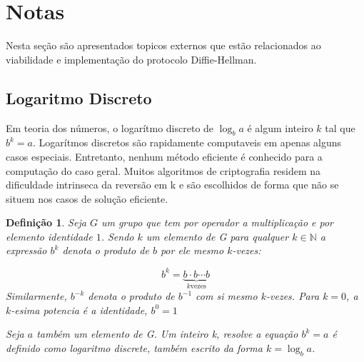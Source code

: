 \documentclass{article}
\newtheorem*{definition}{Definição}
\begin{document}
\section{Notas}%
\label{sec:notas}
Nesta seção são apresentados topicos externos que estão relacionados ao
viabilidade e implementação do protocolo Diffie-Hellman.

\subsection{Logaritmo Discreto}%
\label{sub:logaritmo_discreto}
Em teoria dos números, o logarítmo discreto de $\log_{b}{a}$ é algum inteiro
$k$ tal que $b^k=a$. Logarítmos discretos são rapidamente computaveis em apenas
alguns casos especiais. Entretanto, nenhum método eficiente é conhecido para
a computação do caso geral. Muitos algoritmos de criptografia residem na
dificuldade intrinseca da reversão em k e são escolhidos de forma que não se
situem nos casos de solução eficiente.

\begin{definition}
    Seja $G$ um grupo que tem por operador a multiplicação e por elemento
    identidade $1$. Sendo $k$ um elemento de G para qualquer
    $k \in \mathbb{N}$ a expressão $b^k$ denota o produto de $b$ por ele mesmo
    $k$-vezes:

    \[
    b^{k}=\underbrace{b\cdot b\cdots b}_{k\text{vezes}}
    \]
    Similarmente, $b^{-k}$ denota o produto de $b^{-1}$ com si mesmo $k$-vezes.
    Para $k=0$, a $k$-esima potencia é a identidade, $b^0=1$

    Seja $a$ também um elemento de G. Um inteiro k, resolve a equação $b^k=a$ é
    definido como logaritmo discrete, também escrito da forma $k=\log_b{a}$.
\end{definition}




\end{document}
